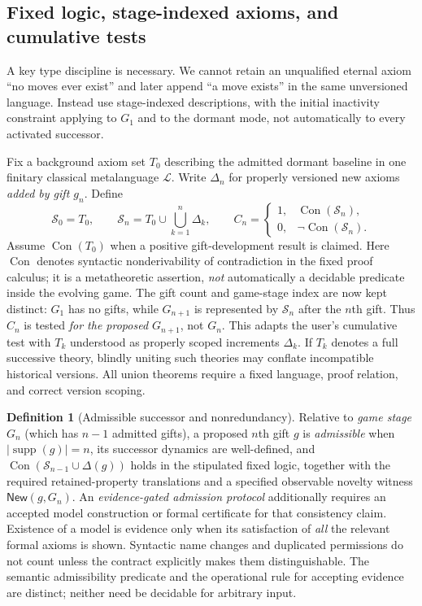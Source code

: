 \documentclass[11pt,letterpaper]{article}
\theoremstyle{definition}\newtheorem{definition}[theorem]{Definition}\newtheorem{example}[theorem]{Example}
\theoremstyle{remark}\newtheorem{remark}[theorem]{Remark}
\newcommand{\Con}{\operatorname{Con}}
\newcommand{\Novel}{\mathsf{New}}
\newcommand{\Stage}{\mathcal{S}}
\begin{document}
\subsection{Fixed logic, stage-indexed axioms, and cumulative tests}
A key type discipline is necessary. We cannot retain an unqualified eternal axiom ``no moves ever exist'' and later append ``a move exists'' in the same unversioned language. Instead use stage-indexed descriptions, with the initial inactivity constraint applying to $G_1$ and to the dormant mode, not automatically to every activated successor.

Fix a background axiom set $T_0$ describing the admitted dormant baseline in one finitary classical metalanguage $\mathcal L$. Write $\Delta_n$ for properly versioned new axioms \emph{added by gift $g_n$}. Define
\[
\Stage_0=T_0,\qquad
\Stage_n=T_0\cup\bigcup_{k=1}^n\Delta_k,\qquad
C_n=\begin{cases}
1,&\Con(\Stage_n),\\
0,&\neg\Con(\Stage_n).
\end{cases}
\]
Assume $\Con(T_0)$ when a positive gift-development result is claimed. Here $\Con$ denotes syntactic nonderivability of contradiction in the fixed proof calculus; it is a metatheoretic assertion, \emph{not} automatically a decidable predicate inside the evolving game.
The gift count and game-stage index are now kept distinct: $G_1$ has no gifts, while $G_{n+1}$ is represented by $\Stage_n$ after the $n$th gift. Thus $C_n$ is tested \emph{for the proposed $G_{n+1}$}, not $G_n$. This adapts the user's cumulative test with $T_k$ understood as properly scoped increments $\Delta_k$. If $T_k$ denotes a full successive theory, blindly uniting such theories may conflate incompatible historical versions. All union theorems require a fixed language, proof relation, and correct version scoping.

\begin{definition}[Admissible successor and nonredundancy]\label{w0:def:adm}
Relative to \emph{game stage} $G_n$ (which has $n-1$ admitted gifts), a proposed $n$th gift $g$ is \emph{admissible} when $|\operatorname{supp}(g)|=n$, its successor dynamics are well-defined, and $\Con(\Stage_{n-1}\cup\Delta(g))$ holds in the stipulated fixed logic, together with the required retained-property translations and a specified observable novelty witness $\Novel(g,G_n)$. An \emph{evidence-gated admission protocol} additionally requires an accepted model construction or formal certificate for that consistency claim. Existence of a model is evidence only when its satisfaction of \emph{all} the relevant formal axioms is shown. Syntactic name changes and duplicated permissions do not count unless the contract explicitly makes them distinguishable. The semantic admissibility predicate and the operational rule for accepting evidence are distinct; neither need be decidable for arbitrary input.
\end{definition}
\end{document}
